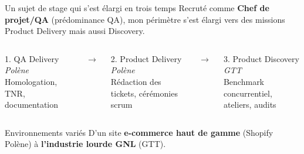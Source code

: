 \begin{frame}{Un sujet de stage qui s'est élargi en trois temps}
  \footnotesize Recruté comme \textbf{Chef de projet/QA} (prédominance QA), mon périmètre s'est élargi vers des missions Product Delivery mais aussi Discovery.
  \vskip 10pt
  \begin{columns}[c]
      \begin{exampleblock}{1. QA Delivery}
        \footnotesize \textit{Polène} \\[3pt]
        Homologation, TNR, documentation
      \end{exampleblock}
    \centering $\to$
      \begin{exampleblock}{2. Product Delivery}
        \footnotesize \textit{Polène} \\[3pt]
        Rédaction des tickets, cérémonies scrum
      \end{exampleblock}
    \centering $\to$
      \begin{block}{3. Product Discovery}
        \footnotesize \textit{GTT} \\[3pt]
        Benchmark concurrentiel, ateliers, audits
      \end{block}
  \end{columns}
  \vskip 12pt
  \begin{alertblock}{Environnements variés}
        \footnotesize D'un site \textbf{e-commerce haut de gamme} (Shopify Polène) à \textbf{l'industrie lourde GNL} (GTT).
      \end{alertblock}
\end{frame}

